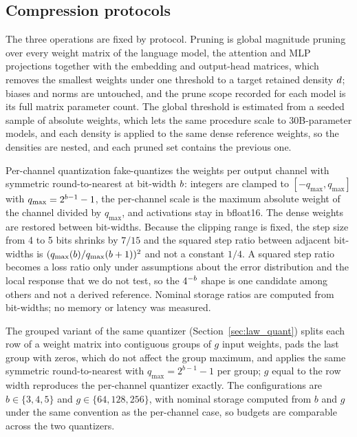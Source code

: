 \subsection{Compression protocols}
\label{sec:app_compress}

The three operations are fixed by protocol. Pruning is global magnitude pruning over every weight matrix of the language model, the attention and MLP projections together with the embedding and output-head matrices, which removes the smallest weights under one threshold to a target retained density $d$; biases and norms are untouched, and the prune scope recorded for each model is its full matrix parameter count. The global threshold is estimated from a seeded sample of
absolute weights, which lets the same procedure scale to 30B-parameter models, and each density is
applied to the same dense reference weights, so the densities are nested, and each pruned set contains the previous one.

Per-channel quantization fake-quantizes the weights per output channel with symmetric
round-to-nearest at bit-width $b$: integers are clamped to $[-q_{\max},q_{\max}]$ with
$q_{\max}=2^{b-1}-1$, the per-channel scale is the maximum absolute weight of the channel divided by
$q_{\max}$, and activations stay in bfloat16. The dense weights are restored between bit-widths.
Because the clipping range is fixed, the step size from 4 to 5 bits shrinks by $7/15$ and the
squared step ratio between adjacent bit-widths is $(q_{\max}(b)/q_{\max}(b+1))^2$ and
not a constant $1/4$. A squared step ratio becomes a loss ratio only under assumptions about the
error distribution and the local response that we do not test, so the $4^{-b}$ shape is one
candidate among others and not a derived reference. Nominal storage ratios are computed from
bit-widths; no memory or latency was measured.

The grouped variant of the same quantizer (Section~\ref{sec:law_quant}) splits each row of a
weight matrix into contiguous groups of $g$ input weights, pads the last group with zeros, which do
not affect the group maximum, and applies the same symmetric round-to-nearest with
$q_{\max}=2^{b-1}-1$ per group; $g$ equal to the row width reproduces the per-channel quantizer
exactly. The configurations are $b\in\{3,4,5\}$ and $g\in\{64,128,256\}$, with nominal storage
computed from $b$ and $g$ under the same convention as the per-channel case, so budgets are
comparable across the two quantizers.

